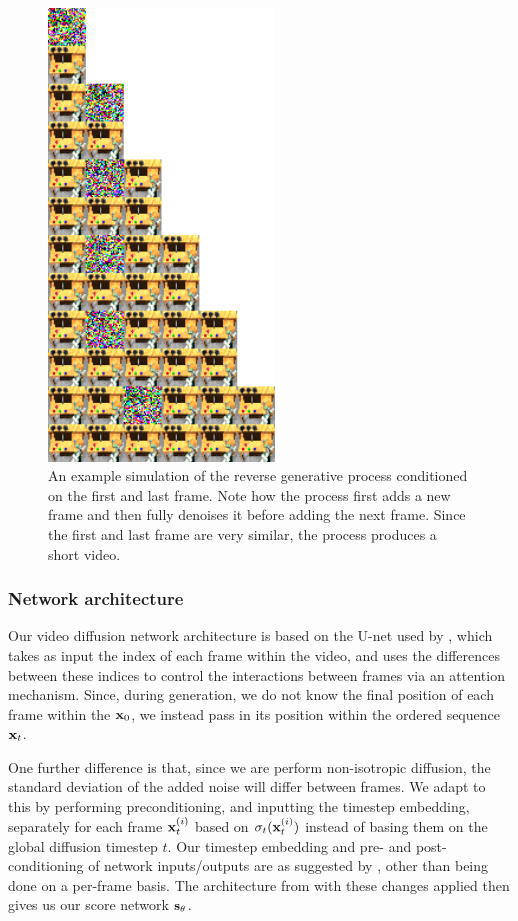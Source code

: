 \begin{figure}
    \centering
    \includegraphics[width=6cm]{figs/tddm/short-obs-32.png}
    \caption{An example simulation of the reverse generative process conditioned on the first and last frame. Note how the process first adds a new frame and then fully denoises it before adding the next frame. Since the first and last frame are very similar, the process produces a short video.}
    \label{fig:tddm-examplevideoreverse}
\end{figure}




\subsubsection{Network architecture}
Our video diffusion network architecture is based on the U-net used by \citet{harvey2022flexible}, which takes as input the index of each frame within the video, and uses the differences between these indices to control the interactions between frames via an attention mechanism. Since, during generation, we do not know the final position of each frame within the ${\mathbf{x}}_0$, we instead pass in its position within the ordered sequence ${\mathbf{x}}_t$.

One further difference is that, since we are perform non-isotropic diffusion, the standard deviation of the added noise will differ between frames. We adapt to this by performing preconditioning, and inputting the timestep embedding, separately for each frame ${\mathbf{x}}_t^{(i)}$ based on $\sigma_t({\mathbf{x}}_t^{(i)})$ instead of basing them on the global diffusion timestep $t$. Our timestep embedding and pre- and post-conditioning of network inputs/outputs are as suggested by \citet{karras2022elucidating}, other than being done on a per-frame basis. The architecture from \citet{harvey2022flexible} with these changes applied then gives us our score network ${\mathbf{s}}_\theta$.

